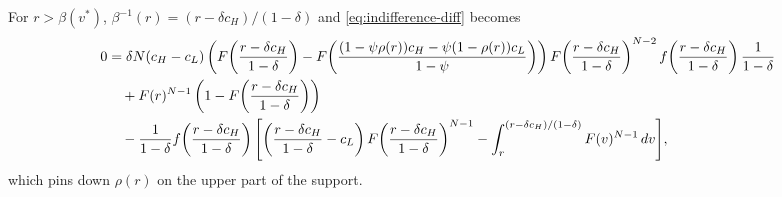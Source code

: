 For $r>\beta(v^{*})$, $\beta^{-1}(r)=(r-\delta c_H)/(1-\delta)$ and
\eqref{eq:indifference-diff} becomes
\begin{align}
  0
  &= \delta N (c_H - c_L)
    \left(
      F\!\left(\frac{r - \delta c_H}{1 - \delta}\right)
      - F\!\left(
        \frac{
          (1 - \psi \rho(r)) c_H
          - \psi(1 - \rho(r)) c_L
        }{1 - \psi}
      \right)
    \right)
    F\!\left(\frac{r - \delta c_H}{1 - \delta}\right)^{N-2}
    f\!\left(\frac{r - \delta c_H}{1 - \delta}\right)
    \frac{1}{1 - \delta}
  \notag\\
  &\quad + F(r)^{N-1}
    \left(1 - F\!\left(\frac{r - \delta c_H}{1 - \delta}\right)\right)
  \notag\\
  &\quad - \frac{1}{1 - \delta}
    f\!\left(\frac{r - \delta c_H}{1 - \delta}\right)
    \Biggl[
      \left(\frac{r - \delta c_H}{1 - \delta} - c_L\right)
        F\!\left(\frac{r - \delta c_H}{1 - \delta}\right)^{N-1}
      - \int_{r}^{(r - \delta c_H)/(1 - \delta)} F(v)^{N-1}\, dv
    \Biggr],
  \label{eq:indifference-high-r}
\end{align}
which pins down $\rho(r)$ on the upper part of the support.
